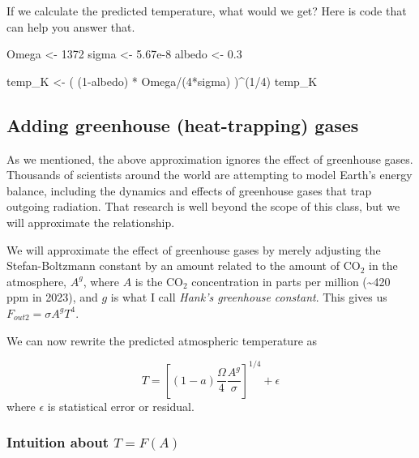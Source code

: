 \documentclass[
  letterpaper,
  DIV=11,
  numbers=noendperiod]{scrreprt}
\newenvironment{Shaded}{\begin{snugshade}}{\end{snugshade}}
\newcommand{\DecValTok}[1]{\textcolor[rgb]{0.68,0.00,0.00}{#1}}
\newcommand{\FloatTok}[1]{\textcolor[rgb]{0.68,0.00,0.00}{#1}}
\newcommand{\NormalTok}[1]{\textcolor[rgb]{0.00,0.23,0.31}{#1}}
\newcommand{\OtherTok}[1]{\textcolor[rgb]{0.00,0.23,0.31}{#1}}
\newcommand{\SpecialCharTok}[1]{\textcolor[rgb]{0.37,0.37,0.37}{#1}}
\begin{document}
If we calculate the predicted temperature, what would we get? Here is
code that can help you answer that.

\begin{Shaded}
\begin{Highlighting}[]
\NormalTok{Omega }\OtherTok{\textless{}{-}} \DecValTok{1372}
\NormalTok{sigma }\OtherTok{\textless{}{-}} \FloatTok{5.67e{-}8}
\NormalTok{albedo }\OtherTok{\textless{}{-}} \FloatTok{0.3}

\NormalTok{temp\_K }\OtherTok{\textless{}{-}}\NormalTok{ ( (}\DecValTok{1}\SpecialCharTok{{-}}\NormalTok{albedo) }\SpecialCharTok{*}\NormalTok{ Omega}\SpecialCharTok{/}\NormalTok{(}\DecValTok{4}\SpecialCharTok{*}\NormalTok{sigma) )}\SpecialCharTok{\^{}}\NormalTok{(}\DecValTok{1}\SpecialCharTok{/}\DecValTok{4}\NormalTok{)}
\NormalTok{temp\_K}
\end{Highlighting}
\end{Shaded}

\subsection{Adding greenhouse (heat-trapping)
gases}\label{adding-greenhouse-heat-trapping-gases}

As we mentioned, the above approximation ignores the effect of
greenhouse gases. Thousands of scientists around the world are
attempting to model Earth's energy balance, including the dynamics and
effects of greenhouse gases that trap outgoing radiation. That research
is well beyond the scope of this class, but we will approximate the
relationship.

We will approximate the effect of greenhouse gases by merely adjusting
the Stefan-Boltzmann constant by an amount related to the amount of
CO\(_2\) in the atmosphere, \(A^g\), where \(A\) is the CO\(_2\)
concentration in parts per million (\textasciitilde420 ppm in 2023), and
\(g\) is what I call \emph{Hank's greenhouse constant}. This gives us
\(F_{out2} = \sigma A^g T^4\).

We can now rewrite the predicted atmospheric temperature as

\[T = \left[ \left(1-a\right)\frac{\Omega}{4}\frac{A^g}{\sigma} \right] ^{1/4} + \epsilon\]
where \(\epsilon\) is statistical error or residual.

\subsubsection{\texorpdfstring{Intuition about
\(T = F(A)\)}{Intuition about T = F(A)}}\label{intuition-about-t-fa}
\end{document}
